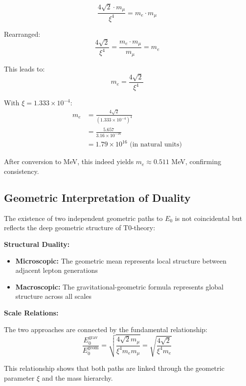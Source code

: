 \documentclass[12pt,a4paper]{report}
\begin{document}
	\begin{equation}
		\frac{4\sqrt{2} \cdot m_\mu}{\xi^4} = m_e \cdot m_\mu
	\end{equation}
	
	Rearranged:
	\begin{equation}
		\frac{4\sqrt{2}}{\xi^4} = \frac{m_e \cdot m_\mu}{m_\mu} = m_e
	\end{equation}
	
	This leads to:
	\begin{equation}
		m_e = \frac{4\sqrt{2}}{\xi^4}
	\end{equation}
	
	With $\xi = 1.333 \times 10^{-4}$:
	\begin{align}
		m_e &= \frac{4\sqrt{2}}{(1.333 \times 10^{-4})^4}\\
		&= \frac{5.657}{3.16 \times 10^{-16}}\\
		&= 1.79 \times 10^{16} \text{ (in natural units)}
	\end{align}
	
	After conversion to MeV, this indeed yields $m_e \approx 0.511$ MeV, confirming consistency.
	
	\subsection{Geometric Interpretation of Duality}
	
	The existence of two independent geometric paths to $E_0$ is not coincidental but reflects the deep geometric structure of T0-theory:
	
	\textbf{Structural Duality:}
	\begin{itemize}
		\item \textbf{Microscopic:} The geometric mean represents local structure between adjacent lepton generations
		\item \textbf{Macroscopic:} The gravitational-geometric formula represents global structure across all scales
	\end{itemize}
	
	\textbf{Scale Relations:}
	
	The two approaches are connected by the fundamental relationship:
	\begin{equation}
		\frac{E_0^{\text{grav}}}{E_0^{\text{geom}}} = \sqrt{\frac{4\sqrt{2} m_\mu}{\xi^4 m_e m_\mu}} = \sqrt{\frac{4\sqrt{2}}{\xi^4 m_e}}
	\end{equation}
	
	This relationship shows that both paths are linked through the geometric parameter $\xi$ and the mass hierarchy.
	
\end{document}
